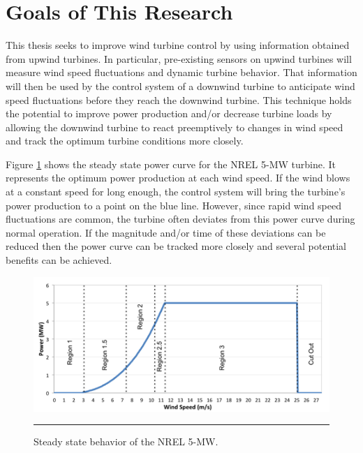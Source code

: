 
\section{Goals of This Research} 

This thesis seeks to improve wind turbine control by using information obtained from upwind turbines.  In particular, pre-existing sensors on upwind turbines will measure wind speed fluctuations and dynamic turbine behavior.  That information will then be used by the control system of a downwind turbine to anticipate wind speed fluctuations before they reach the downwind turbine.  This technique holds the potential to improve power production and/or decrease turbine loads by allowing the downwind turbine to react preemptively to changes in wind speed and track the optimum turbine conditions more closely.

Figure \ref{fig1-6} shows the steady state power curve for the NREL 5-MW turbine.  It represents the optimum power production at each wind speed.  If the wind blows at a constant speed for long enough, the control system will bring the turbine’s power production to a point on the blue line.  However, since rapid wind speed fluctuations are common, the turbine often deviates from this power curve during normal operation.  If the magnitude and/or time of these deviations can be reduced then the power curve can be tracked more closely and several potential benefits can be achieved.


\begin{figure}[htbp]
	\centering
		\includegraphics[width=\linewidth]{Figures/ch1Figures/fig1-6.png}
		\rule{35em}{0.5pt}
	\caption{Steady state behavior of the NREL 5-MW.\cite{jonkman2009}}
	\label{fig1-6}
\end{figure}

